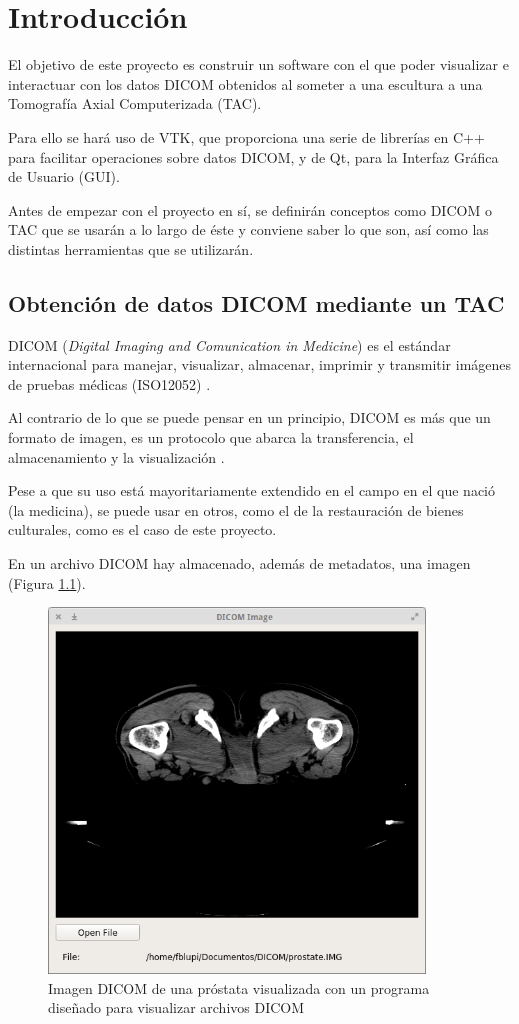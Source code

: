 \chapter{Introducción}
El objetivo de este proyecto es construir un software con el que poder visualizar e interactuar con los datos DICOM obtenidos al someter a una escultura a una Tomografía Axial Computerizada (TAC). 

Para ello se hará uso de VTK, que proporciona una serie de librerías en C++ para facilitar operaciones sobre datos DICOM, y de Qt, para la Interfaz Gráfica de Usuario (GUI).

Antes de empezar con el proyecto en sí, se definirán conceptos como DICOM o TAC que se usarán a lo largo de éste y conviene saber lo que son, así como las distintas herramientas que se utilizarán.

\section{Obtención de datos DICOM mediante un TAC}
DICOM (\textit{Digital Imaging and Comunication in Medicine}) es el estándar internacional para manejar, visualizar, almacenar, imprimir y transmitir imágenes de pruebas médicas (ISO12052) \cite{about_dicom}. 

Al contrario de lo que se puede pensar en un principio, DICOM es más que un formato de imagen, es un protocolo que abarca la transferencia, el almacenamiento y la visualización \cite{dicom_intro_and_guide}.

Pese a que su uso está mayoritariamente extendido en el campo en el que nació (la medicina), se puede usar en otros, como el de la restauración de bienes culturales, como es el caso de este proyecto.

En un archivo DICOM hay almacenado, además de metadatos, una imagen \cite{dicom_classes_vtk} (Figura \ref{fig:prostate_dicom}).

\begin{figure}[H]
	\centering
	\includegraphics[width=10cm]{imagenes/prostate_dicom}
	\caption{Imagen DICOM de una próstata visualizada con un programa diseñado para visualizar archivos DICOM}
	\label{fig:prostate_dicom}
\end{figure}

